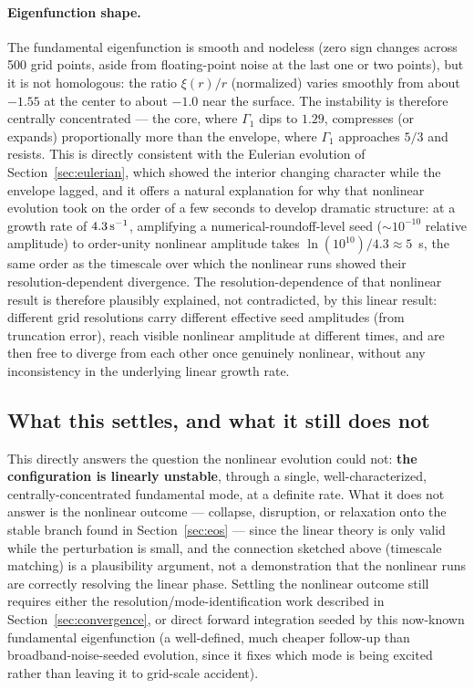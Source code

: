 \documentclass[11pt]{article}
\begin{document}
\paragraph{Eigenfunction shape.} The fundamental eigenfunction is smooth and nodeless (zero sign changes across 500 grid points, aside from floating-point noise at the last one or two points), but it is not homologous: the ratio $\xi(r)/r$ (normalized) varies smoothly from about $-1.55$ at the center to about $-1.0$ near the surface. The instability is therefore centrally concentrated — the core, where $\Gamma_1$ dips to $1.29$, compresses (or expands) proportionally more than the envelope, where $\Gamma_1$ approaches $5/3$ and resists. This is directly consistent with the Eulerian evolution of Section~\ref{sec:eulerian}, which showed the interior changing character while the envelope lagged, and it offers a natural explanation for why that nonlinear evolution took on the order of a few seconds to develop dramatic structure: at a growth rate of $4.3\,{\rm s}^{-1}$, amplifying a numerical-roundoff-level seed ($\sim10^{-10}$ relative amplitude) to order-unity nonlinear amplitude takes $\ln(10^{10})/4.3\approx5$~s, the same order as the timescale over which the nonlinear runs showed their resolution-dependent divergence. The resolution-dependence of that nonlinear result is therefore plausibly explained, not contradicted, by this linear result: different grid resolutions carry different effective seed amplitudes (from truncation error), reach visible nonlinear amplitude at different times, and are then free to diverge from each other once genuinely nonlinear, without any inconsistency in the underlying linear growth rate.

\subsection{What this settles, and what it still does not}

This directly answers the question the nonlinear evolution could not: \textbf{the configuration is linearly unstable}, through a single, well-characterized, centrally-concentrated fundamental mode, at a definite rate. What it does not answer is the nonlinear outcome — collapse, disruption, or relaxation onto the stable branch found in Section~\ref{sec:eos} — since the linear theory is only valid while the perturbation is small, and the connection sketched above (timescale matching) is a plausibility argument, not a demonstration that the nonlinear runs are correctly resolving the linear phase. Settling the nonlinear outcome still requires either the resolution/mode-identification work described in Section~\ref{sec:convergence}, or direct forward integration seeded by this now-known fundamental eigenfunction (a well-defined, much cheaper follow-up than broadband-noise-seeded evolution, since it fixes which mode is being excited rather than leaving it to grid-scale accident).
\end{document}
